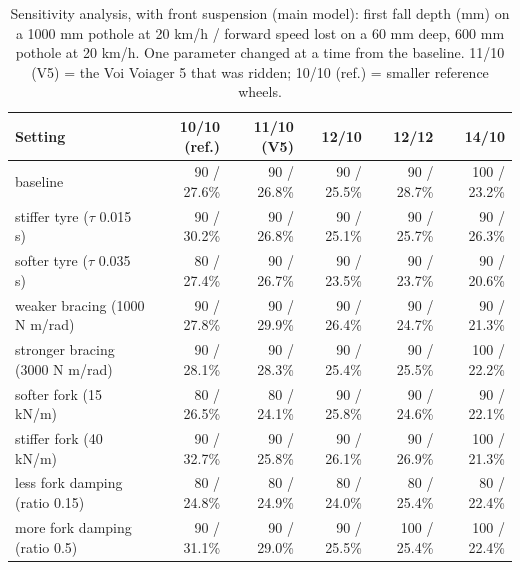 \begin{table}[htbp]
\centering\small
\caption{Sensitivity analysis, with front suspension (main model): first fall depth (mm) on a 1000 mm pothole at 20 km/h / forward speed lost on a 60 mm deep, 600 mm pothole at 20 km/h. One parameter changed at a time from the baseline. 11/10 (V5) = the Voi Voiager 5 that was ridden; 10/10 (ref.) = smaller reference wheels.}\label{tab:Esensfork}
\begin{tabular}{@{}p{40mm}rrrrr@{}}
\toprule
Setting & 10/10 (ref.) & 11/10 (V5) & 12/10 & 12/12 & 14/10 \\
\midrule
baseline & 90 / 27.6\% & 90 / 26.8\% & 90 / 25.5\% & 90 / 28.7\% & 100 / 23.2\% \\
stiffer tyre ($\tau$ 0.015 s) & 90 / 30.2\% & 90 / 26.8\% & 90 / 25.1\% & 90 / 25.7\% & 90 / 26.3\% \\
softer tyre ($\tau$ 0.035 s) & 80 / 27.4\% & 90 / 26.7\% & 90 / 23.5\% & 90 / 23.7\% & 90 / 20.6\% \\
weaker bracing (1000 N m/rad) & 90 / 27.8\% & 90 / 29.9\% & 90 / 26.4\% & 90 / 24.7\% & 90 / 21.3\% \\
stronger bracing (3000 N m/rad) & 90 / 28.1\% & 90 / 28.3\% & 90 / 25.4\% & 90 / 25.5\% & 100 / 22.2\% \\
softer fork (15 kN/m) & 80 / 26.5\% & 80 / 24.1\% & 90 / 25.8\% & 90 / 24.6\% & 90 / 22.1\% \\
stiffer fork (40 kN/m) & 90 / 32.7\% & 90 / 25.8\% & 90 / 26.1\% & 90 / 26.9\% & 100 / 21.3\% \\
less fork damping (ratio 0.15) & 80 / 24.8\% & 80 / 24.9\% & 80 / 24.0\% & 80 / 25.4\% & 80 / 22.4\% \\
more fork damping (ratio 0.5) & 90 / 31.1\% & 90 / 29.0\% & 90 / 25.5\% & 100 / 25.4\% & 100 / 22.4\% \\
\bottomrule
\end{tabular}
\end{table}

